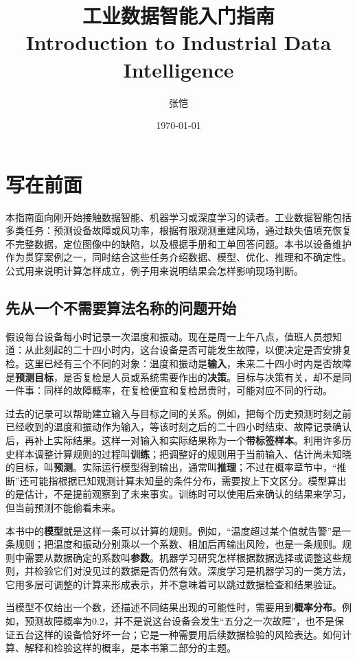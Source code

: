 ﻿\documentclass[a4paper,UTF8,zihao=-4,openany]{ctexbook}
\title{工业数据智能入门指南 \\ Introduction to Industrial Data Intelligence}
\author{张恺}
\date{\today}
\begin{document}
\maketitle
\frontmatter
\tableofcontents
\chapter*{写在前面}
本指南面向刚开始接触数据智能、机器学习或深度学习的读者。工业数据智能包括多类任务：预测设备故障或风功率，根据有限观测重建风场，通过缺失值填充恢复不完整数据，定位图像中的缺陷，以及根据手册和工单回答问题。本书以设备维护作为贯穿案例之一，同时结合这些任务介绍数据、模型、优化、推理和不确定性。公式用来说明计算怎样成立，例子用来说明结果会怎样影响现场判断。

\section*{先从一个不需要算法名称的问题开始}
假设每台设备每小时记录一次温度和振动。现在是周一上午八点，值班人员想知道：从此刻起的二十四小时内，这台设备是否可能发生故障，以便决定是否安排复检。这里已经有三个不同的对象：温度和振动是\textbf{输入}，未来二十四小时内是否故障是\textbf{预测目标}，是否复检是人员或系统需要作出的\textbf{决策}。目标与决策有关，却不是同一件事：同样的故障概率，在复检便宜和复检昂贵时，可能对应不同的行动。

过去的记录可以帮助建立输入与目标之间的关系。例如，把每个历史预测时刻之前已经收到的温度和振动作为输入，等该时刻之后的二十四小时结束、故障记录确认后，再补上实际结果。这样一对输入和实际结果称为一个\textbf{带标签样本}。利用许多历史样本调整计算规则的过程叫\textbf{训练}；把调整好的规则用于当前输入、估计尚未知晓的目标，叫\textbf{预测}。实际运行模型得到输出，通常叫\textbf{推理}；不过在概率章节中，“推断”还可能指根据已知观测计算未知量的条件分布，需要按上下文区分。模型算出的是估计，不是提前观察到了未来事实。训练时可以使用后来确认的结果来学习，但当前预测不能偷看未来。

本书中的\textbf{模型}就是这样一条可以计算的规则。例如，“温度超过某个值就告警”是一条规则；把温度和振动分别乘以一个系数、相加后再输出风险，也是一条规则。规则中需要从数据确定的系数叫\textbf{参数}。机器学习研究怎样根据数据选择或调整这些规则，并检验它们对没见过的数据是否仍然有效。深度学习是机器学习的一类方法，它用多层可调整的计算来形成表示，并不意味着可以跳过数据检查和结果验证。

当模型不仅给出一个数，还描述不同结果出现的可能性时，需要用到\textbf{概率分布}。例如，预测故障概率为$0.2$，并不是说这台设备会发生“五分之一次故障”，也不是保证五台这样的设备恰好坏一台；它是一种需要用后续数据检验的风险表达。如何计算、解释和检验这样的概率，是本书第二部分的主题。
\end{document}
